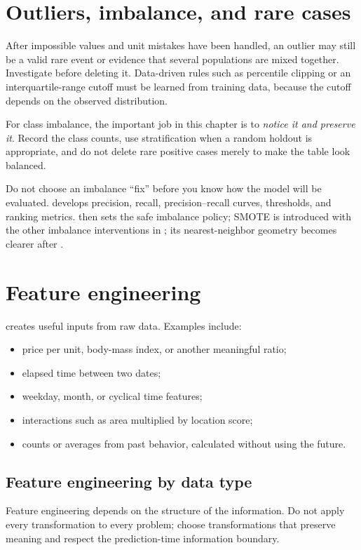 \section{Outliers, imbalance, and rare cases}

After impossible values and unit mistakes have been handled, an outlier may still be a valid rare event or evidence that several populations are mixed together. Investigate before deleting it. Data-driven rules such as percentile clipping or an interquartile-range cutoff must be learned from training data, because the cutoff depends on the observed distribution.

For class imbalance, the important job in this chapter is to \emph{notice it and preserve it}. Record the class counts, use stratification when a random holdout is appropriate, and do not delete rare positive cases merely to make the table look balanced.

\begin{keyidea}
Do not choose an imbalance ``fix'' before you know how the model will be evaluated.  develops precision, recall, precision--recall curves, thresholds, and ranking metrics.  then sets the safe imbalance policy; SMOTE is introduced with the other imbalance interventions in ; its nearest-neighbor geometry becomes clearer after .
\end{keyidea}

\section{Feature engineering}

 creates useful inputs from raw data. Examples include:

\begin{itemize}
  \item price per unit, body-mass index, or another meaningful ratio;
  \item elapsed time between two dates;
  \item weekday, month, or cyclical time features;
  \item interactions such as area multiplied by location score;
  \item counts or averages from past behavior, calculated without using the future.
\end{itemize}

\subsection*{Feature engineering by data type}
Feature engineering depends on the structure of the information. Do not apply every transformation to every problem; choose transformations that preserve meaning and respect the prediction-time information boundary.

